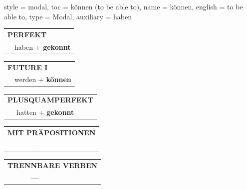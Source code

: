 \begin{verbentry}{
  style = {modal},
  toc = {können (to be able to)},
  name = {können},
  english = {to be able to},
  type = {Modal},
  auxiliary = {haben}
}
    \vspace{10pt}
 
    \begin{tabular}{rl}
     \multicolumn{2}{l}{\textbf{PERFEKT}}\\
   & haben + \textbf{gekonnt}\\
  \end{tabular}
\hfill
   \begin{tabular}{rl}
   
    \multicolumn{2}{l}{\textbf{FUTURE I} }\\
 &   werden + \textbf{können}\\
 
  \end{tabular}
\hfill
   \begin{tabular}{rl}
      \multicolumn{2}{l}{\textbf{PLUSQUAMPERFEKT}}\\
  &  hatten + \textbf{gekonnt}\\
  \end{tabular}
  
  
\vspace{10pt}

\begin{tabular}{lll}
\multicolumn{3}{l}{\textbf{MIT PRÄPOSITIONEN}}\\
& \textbf{---} & \\
\end{tabular}
\hfill
\begin{tabular}{lll}
\multicolumn{3}{l}{\textbf{TRENNBARE VERBEN}}\\
& \textbf{---} & \\
\end{tabular}
\vspace{-5pt}
\end{verbentry}

